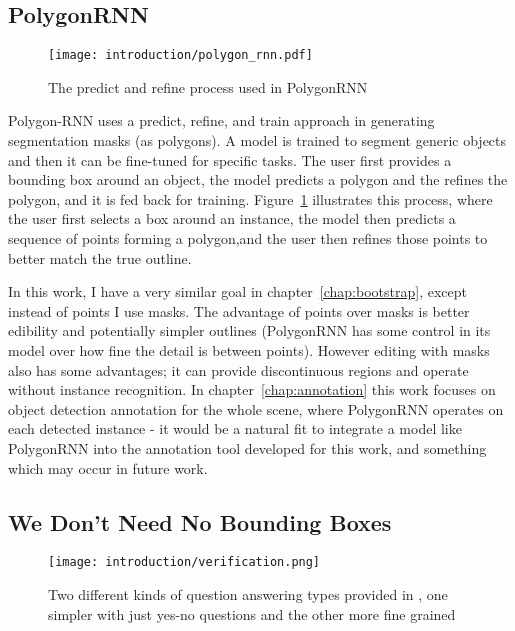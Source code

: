\subsection {PolygonRNN \cite{Castrejon2017}}

\begin{figure}[h]
  \centering
  \texttt{[image: introduction/polygon\_rnn.pdf]}
  \caption{The predict and refine process used in PolygonRNN \cite{Castrejon2017}}  
  \label{fig:polygon_rnn}
\end{figure}


Polygon-RNN \cite{Castrejon2017} uses a predict, refine, and train approach in generating segmentation masks (as polygons). A model is trained to segment generic objects and then it can be fine-tuned for specific tasks. The user first provides a bounding box around an object, the model predicts a polygon and the refines the polygon, and it is fed back for training. Figure~\ref{fig:polygon_rnn} illustrates this process, where the user first selects a box around an instance, the model then predicts a sequence of points forming a polygon,and the user then refines those points to better match the true outline.

In this work, I have a very similar goal in chapter~\ref{chap:bootstrap}, except instead of points I use masks. The advantage of points over masks is better edibility and potentially simpler outlines (PolygonRNN has some control in its model over how fine the detail is between points). However editing with masks also has some advantages; it can provide discontinuous regions and operate without instance recognition. In chapter~\ref{chap:annotation} this work focuses on object detection annotation for the whole scene, where PolygonRNN operates on each detected instance - it would be a natural fit to integrate a model like PolygonRNN into the annotation tool developed for this work, and something which may occur in future work.


\subsection {We Don't Need No Bounding Boxes}

\begin{figure}[h]
  \centering
  \texttt{[image: introduction/verification.png]}
  \caption{Two different kinds of question answering types provided in \cite{Papadopoulos2016}, one simpler with just yes-no questions and the other more fine grained}
  \label{fig:verification}
\end{figure}

